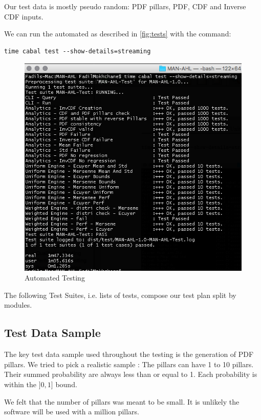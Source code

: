 \documentclass[12pt,a4paper,article]{memoir} %
\begin{document}
Our test data is mostly pseudo random: 
PDF pillars, PDF, CDF and Inverse CDF inputs.

We can run the automated as described in  \autoref{fig:tests} with the command:
\begin{verbatim}
time cabal test --show-details=streaming
\end{verbatim}
\begin{figure}[h!]
\begin{center}
\includegraphics[width=1\textwidth]{img/tests.png}
\caption{Automated Testing}
\label{fig:tests}
\end{center}
\end{figure}

The following Test Suites, i.e. lists of tests, compose our test plan split by modules.

\subsection{Test Data Sample}

The key test data sample used throughout the testing 
is the generation of PDF pillars.
We tried to pick a realistic sample :
The pillars can have 1 to 10 pillars. Their summed probability are always less 
than or equal to 1.  Each probability is within the $]0, 1]$ bound.

We felt that the number of pillars was meant to be small. It is unlikely
the software will be used with a million pillars. 
\end{document}
